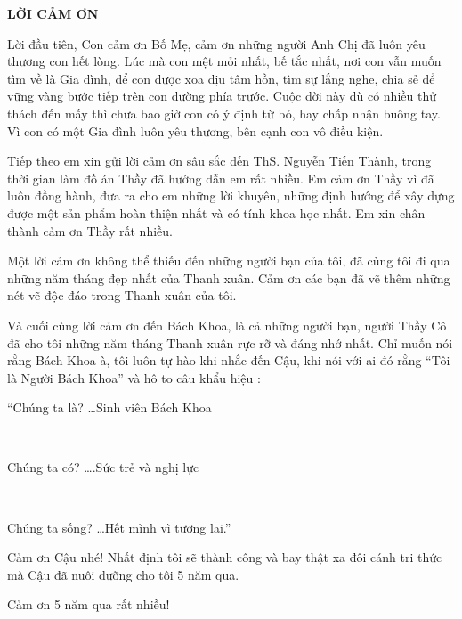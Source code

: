 \documentclass[../DoAn.tex]{subfiles}
\begin{document}
\begin{center}
    \Large{\textbf{LỜI CẢM ƠN}}\\
\end{center}
\vspace{1cm}
Lời đầu tiên, Con cảm ơn Bố Mẹ, cảm ơn những người Anh Chị đã luôn yêu thương con hết lòng. Lúc mà con mệt mỏi nhất, bế tắc nhất, nơi con vẫn muốn tìm về là Gia đình, để con được xoa dịu tâm hồn, tìm sự lắng nghe, chia sẻ để vững vàng bước tiếp trên con đường phía trước. Cuộc đời này dù có nhiều thử thách đến mấy thì chưa bao giờ con có ý định từ bỏ, hay chấp nhận buông tay. Vì con có một Gia đình luôn yêu thương, bên cạnh con vô điều kiện.

Tiếp theo em xin gửi lời cảm ơn sâu sắc đến ThS. Nguyễn Tiến Thành, trong thời gian làm đồ án Thầy đã hướng dẫn em rất nhiều. Em cảm ơn Thầy vì đã luôn đồng hành, đưa ra cho em những lời khuyên, những định hướng để xây dựng được một sản phẩm hoàn thiện nhất và có tính khoa học nhất. Em xin chân thành cảm ơn Thầy rất nhiều.

Một lời cảm ơn không thể thiếu đến những người bạn của tôi, đã cùng tôi đi qua những năm tháng đẹp nhất của Thanh xuân. Cảm ơn các bạn đã vẽ thêm những nét vẽ độc đáo trong Thanh xuân của tôi.

Và cuối cùng lời cảm ơn đến Bách Khoa, là cả những người bạn, người Thầy Cô đã cho tôi những năm tháng Thanh xuân rực rỡ và đáng nhớ nhất. Chỉ muốn nói rằng Bách Khoa à, tôi luôn tự hào khi nhắc đến Cậu, khi nói với ai đó rằng “Tôi là Người Bách Khoa” và hô to câu khẩu hiệu :\\
\centerline{“Chúng ta là? …Sinh viên Bách Khoa}\\
\centerline{Chúng ta có? ….Sức trẻ và nghị lực}\\
\centerline{Chúng ta sống? …Hết mình vì tương lai.”}

Cảm ơn Cậu nhé! Nhất định tôi sẽ thành công và bay thật xa đôi cánh tri thức mà Cậu đã nuôi dưỡng cho tôi 5 năm qua. 

Cảm ơn 5 năm qua rất nhiều!
\end{document}
